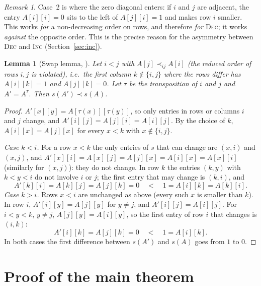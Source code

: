 \documentclass[11pt,a4paper]{article}
\newtheorem{lemma}[theorem]{Lemma}
\theoremstyle{definition}
\theoremstyle{remark}
\newtheorem{remark}[theorem]{Remark}
\newcommand{\slex}{\prec}
\newcommand{\sred}[2]{\mathrel{\prec_{#1#2}}}
\begin{document}
\begin{remark}\label{rem:diag}
Case~2 is where the zero diagonal enters: if $i$ and $j$ are adjacent, the entry
$A[i][i]=0$ sits to the left of $A[j][i]=1$ and makes row $i$ smaller. This works
\emph{for} a non-decreasing order on rows, and therefore \emph{for} \textsc{Dec}; it works
\emph{against} the opposite order. This is the precise reason for the asymmetry between
\textsc{Dec} and \textsc{Inc} (Section~\ref{sec:inc}).
\end{remark}

\begin{lemma}[Swap lemma, \cite{codish13}]\label{lem:swap}
Let $i<j$ with $A[j]\sred ij A[i]$ (the reduced order of rows $i,j$ is violated), i.e.\
the first column $k\notin\{i,j\}$ where the rows differ has $A[i][k]=1$ and $A[j][k]=0$. Let $\tau$ be the transposition of $i$ and $j$ and
$A'=A^{\tau}$. Then $s(A')\slex s(A)$.
\end{lemma}

\begin{proof}
$A'[x][y]=A[\tau(x)][\tau(y)]$, so only entries in rows or columns $i$ and $j$ change, and
$A'[i][j]=A[j][i]=A[i][j]$. By the choice of $k$, $A[i][x]=A[j][x]$ for every
$x<k$ with $x\notin\{i,j\}$.

\emph{Case $k<i$.} For a row $x<k$ the only entries of $s$ that can change are
$(x,i)$ and $(x,j)$, and $A'[x][i]=A[x][j]=A[j][x]=A[i][x]=A[x][i]$ (similarly for $(x,j)$):
they do not change. In row $k$ the entries $(k,y)$ with $k<y<i$ do not involve $i$ or $j$;
the first entry that may change is $(k,i)$, and
\[
  A'[k][i]=A[k][j]=A[j][k]=0 \quad<\quad 1=A[i][k]=A[k][i].
\]
\emph{Case $k>i$.} Rows $x<i$ are unchanged as above (every such $x$ is smaller than $k$).
In row $i$, $A'[i][y]=A[j][y]$ for $y\neq j$, and $A'[i][j]=A[i][j]$. For $i<y<k$, $y\neq j$,
$A[j][y]=A[i][y]$, so the first entry of row $i$ that changes is $(i,k)$:
\[
  A'[i][k]=A[j][k]=0 \quad<\quad 1=A[i][k].
\]
In both cases the first difference between $s(A')$ and $s(A)$ goes from $1$ to $0$.
\end{proof}

\section{Proof of the main theorem}
\end{document}
